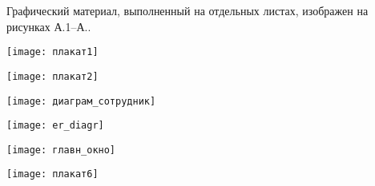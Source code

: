 
Графический материал, выполненный на отдельных листах,
изображен на рисунках А.1--А..
\setcounter{числоПлакатов}{0}

\renewcommand{\thefigure}{А.\arabic{figure}} %

\begin{landscape}

\begin{плакат}
    \texttt{[image: плакат1]}
    \label{pl1:image}      
\end{плакат}

\begin{плакат}
    \texttt{[image: плакат2]}
    \label{pl2:image}      
\end{плакат}

\begin{плакат}
    \texttt{[image: диаграм\_сотрудник]}
    \label{pl3:image}      
\end{плакат}

\begin{плакат}
    \texttt{[image: er\_diagr]}
    \label{pl4:image}      
\end{плакат}

\begin{плакат}
	\texttt{[image: главн\_окно]}
	\label{pl5:image}      
\end{плакат}

\begin{плакат}
	\texttt{[image: плакат6]}
	\label{pl6:image}      
\end{плакат}

\end{landscape}
